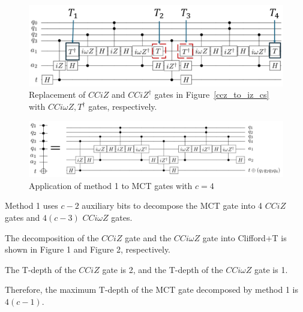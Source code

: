\begin{figure}[tbp]
\centering
\includegraphics[width=14cm]{img/barenco_iz_to_iomegaz.pdf}
\caption{Replacement of $CCiZ$ and $CCiZ^{\dag}$ gates in Figure~\ref{ccz_to_iz_cs} with $CCi\omega Z, T^{\dag}$ gates, respectively.}

\label{barenco_iz_to_iomegaz}

\end{figure}

\begin{figure}[tbp]

\centering

\includegraphics[width=0.9\columnwidth]{img/techmap.pdf}

\caption{Application of method 1 to MCT gates with $c=4$}

\label{techmap}

\end{figure}

\par
Method 1 uses $c-2$ auxiliary bits to decompose the MCT gate into 4 $CCiZ$ gates and $4(c-3)$ $CCi\omega Z$ gates.

The decomposition of the $CCiZ$ gate and the $CCi\omega Z$ gate into Clifford+T is shown in Figure 1 and Figure 2, respectively.

The T-depth of the $CCiZ$ gate is 2, and the T-depth of the $CCi\omega Z$ gate is 1.

Therefore, the maximum T-depth of the MCT gate decomposed by method 1 is $4(c-1)$.

